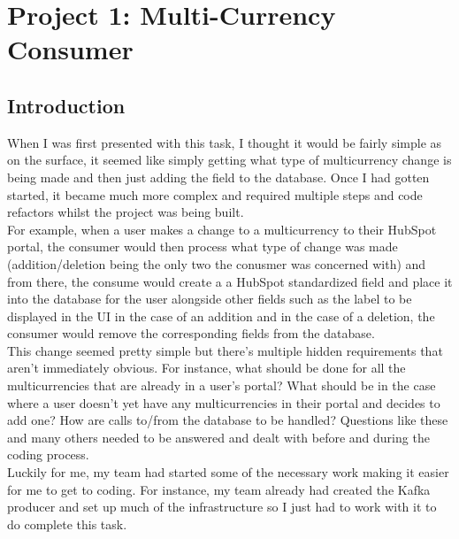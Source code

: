 \chapter{Project 1: Multi-Currency Consumer}

\section{Introduction}
When I was first presented with this task, I thought it would be fairly simple as on the surface, it seemed like simply getting what type of multicurrency change is being made and then just adding the field to the database. Once I had gotten started, it became much more complex and required multiple steps and code refactors whilst the project was being built. \\ For example, when a user makes a change to a multicurrency to their HubSpot portal, the consumer would then process what type of change was made (addition/deletion being the only two the conusmer was concerned with) and from there, the consume would create a a HubSpot standardized field and place it into the database for the user alongside other fields such as the label to be displayed in the UI in the case of an addition and in the case of a deletion, the consumer would remove the corresponding fields from the database. \newline \\ This change seemed pretty simple but there's multiple hidden requirements that aren't immediately obvious. For instance, what should be done for all the multicurrencies that are already in a user's portal? What should be in the case where a user doesn't yet have any multicurrencies in their portal and decides to add one? How are calls to/from the database to be handled? Questions like these and many others needed to be answered and dealt with before and during the coding process. \\ Luckily for me, my team had started some of the necessary work making it easier for me to get to coding. For instance, my team already had created the Kafka producer and set up much of the infrastructure so I just had to work with it to do complete this task.

